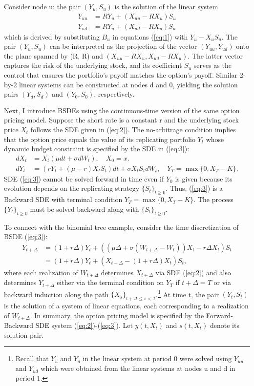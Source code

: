 \documentclass{article}
\begin{document}
\clearpage

Consider node u: the pair $(Y_{u},S_{u})$ is the solution of the linear system
\begin{align*}
Y_{uu}&=RY_{u}+(X_{uu}-RX_{u})S_{u} \\
Y_{ud}&=RY_{u}+(X_{ud}-RX_{u})S_{u}
\end{align*}
which is derived by substituting $B_{u}$ in equations (\ref{eq:1}) with $Y_{u}-X_{u}S_{u}$. The pair $(Y_{u},S_{u})$ can be interpreted as the projection of the vector $(Y_{uu},Y_{ud})$ onto the plane spanned by (R, R) and $(X_{uu}-RX_{u},X_{ud}-RX_{u})$. The latter vector captures the risk of the underlying stock, and its coefficient $S_{u}$ serves as the control that ensures the portfolio's payoff matches the option's payoff. Similar 2-by-2 linear systems can be constructed at nodes d and 0, yielding the solution pairs $(Y_{d},S_{d})$ and $(Y_{0},S_{0})$, respectively.

Next, I introduce BSDEs using the continuous-time version of the same option pricing model. Suppose the short rate is a constant r and the underlying stock price $X_{t}$ follows the SDE given in (\ref{eq:2}). The no-arbitrage condition implies that the option price equals the value of its replicating portfolio $Y_{t}$ whose dynamic budget constraint is specified by the SDE in (\ref{eq:3}):
\begin{align}
dX_{t}&=X_{t}(\mu dt+\sigma dW_{t}), \quad X_{0}=x. \label{eq:2} \\
dY_{t}&=(rY_{t}+(\mu-r)X_{t}S_{t})dt+\sigma X_{t}S_{t}dW_{t}, \quad Y_{T}=\max\{0,X_{T}-K\}. \label{eq:3}
\end{align}
SDE (\ref{eq:3}) cannot be solved forward in time even if $Y_{0}$ is given because its evolution depends on the replicating strategy $\{S_{t}\}_{t\ge0}$. Thus, (\ref{eq:3}) is a Backward SDE with terminal condition $Y_{T}=\max\{0,X_{T}-K\}$. The process $\{Y_{t}\}_{t\ge0}$ must be solved backward along with $\{S_{t}\}_{t\ge0}$.

To connect with the binomial tree example, consider the time discretization of BSDE (\ref{eq:3}):
\begin{align*}
Y_{t+\Delta}&=(1+r\Delta)Y_{t}+((\mu\Delta+\sigma(W_{t+\Delta}-W_{t}))X_{t}-r\Delta X_{t})S_{t} \\
&=(1+r\Delta)Y_{t}+(X_{t+\Delta}-(1+r\Delta)X_{t})S_{t},
\end{align*}
where each realization of $W_{t+\Delta}$ determines $X_{t+\Delta}$ via SDE (\ref{eq:2}) and also determines $Y_{t+\Delta}$ either via the terminal condition on $Y_{T}$ if $t+\Delta=T$ or via backward induction along the path $\{X_{s}\}_{t+\Delta\le s<T}.$\footnote{Recall that $Y_{u}$ and $Y_{d}$ in the linear system at period 0 were solved using $Y_{uu}$ and $Y_{ud}$ which were obtained from the linear systems at nodes u and d in period 1.} At time t, the pair $(Y_{t},S_{t})$ is the solution of a system of linear equations, each corresponding to a realization of $W_{t+\Delta}$. In summary, the option pricing model is specified by the Forward-Backward SDE system (\ref{eq:2})-(\ref{eq:3}). Let $y(t,X_{t})$ and $s(t,X_{t})$ denote its solution pair.
\end{document}
